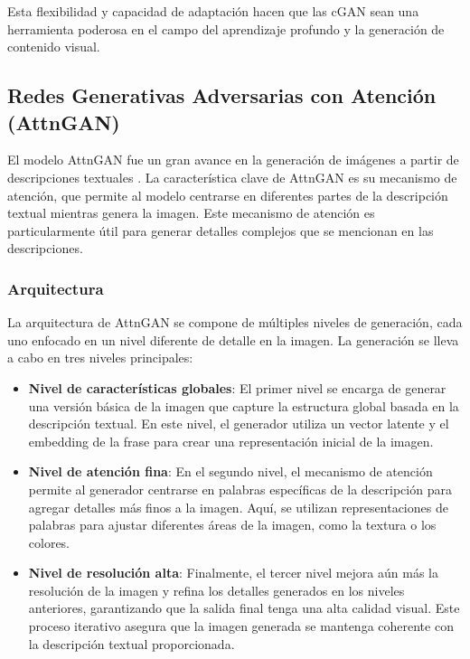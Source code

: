 Esta flexibilidad y capacidad de adaptación hacen que las cGAN sean una herramienta poderosa en el campo del aprendizaje profundo y la generación de contenido visual.

\subsection{Redes Generativas Adversarias con Atención (AttnGAN)}
El modelo AttnGAN fue un gran avance en la generación de imágenes a partir de descripciones textuales . La característica clave de AttnGAN es su mecanismo de atención, que permite al modelo centrarse en diferentes partes de la descripción textual mientras genera la imagen. Este mecanismo de atención es particularmente útil para generar detalles complejos que se mencionan en las descripciones. \cite{xu2018attngan}

\subsubsection{Arquitectura}
La arquitectura de AttnGAN se compone de múltiples niveles de generación, cada uno enfocado en un nivel diferente de detalle en la imagen. La generación se lleva a cabo en tres niveles principales:

\begin{itemize}
    \item \textbf{Nivel de características globales}: El primer nivel se encarga de generar una versión básica de la imagen que capture la estructura global basada en la descripción textual. En este nivel, el generador utiliza un vector latente y el embedding de la frase para crear una representación inicial de la imagen.
    
    \item \textbf{Nivel de atención fina}: En el segundo nivel, el mecanismo de atención permite al generador centrarse en palabras específicas de la descripción para agregar detalles más finos a la imagen. Aquí, se utilizan representaciones de palabras para ajustar diferentes áreas de la imagen, como la textura o los colores.
    \item \textbf{Nivel de resolución alta}: Finalmente, el tercer nivel mejora aún más la resolución de la imagen y refina los detalles generados en los niveles anteriores, garantizando que la salida final tenga una alta calidad visual. Este proceso iterativo asegura que la imagen generada se mantenga coherente con la descripción textual proporcionada.
\end{itemize}

